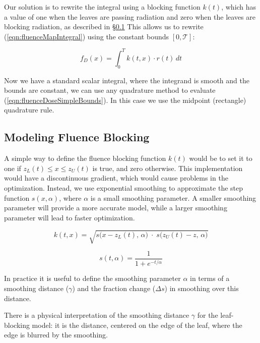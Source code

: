 Our solution is to rewrite the integral using a blocking function $k(t)$,
which has a value of one when the leaves are passing radiation and
zero when the leaves are blocking radiation, as described in \S\ref{sec:modelingFluenceBlocking}
This allows us to rewrite (\ref{eqn:fluenceMapIntegral}) using the constant bounds $[0, \mathcal{T}]$:

\begin{equation}
  f_D(x) = \int_0^T \! k(t, x) \cdot r(t) \, dt
  \label{eqn:fluenceDoseSimpleBounds}
\end{equation}

Now we have a standard scalar integral, where the integrand is smooth and the
bounds are constant, we can use any quadrature method to evaluate (\ref{eqn:fluenceDoseSimpleBounds}).
In this case we use the midpoint (rectangle) quadrature rule.

\subsection{Modeling Fluence Blocking}
\label{sec:modelingFluenceBlocking}

A simple way to define the fluence blocking function $k(t)$
would be to set it to one if $z_L(t) \leq x \leq z_U(t)$
is true, and zero otherwise.
This implementation would have a discontinuous gradient, which would cause problems in the optimization.
Instead, we use exponential smoothing to approximate the step function $s(x,\alpha)$,
where $\alpha$ is a small smoothing parameter.
A smaller smoothing parameter will provide a more accurate model,
while a larger smoothing parameter will lead to faster optimization.

\begin{equation}
  k(t, x) = \sqrt{s\big(x - z_L(t), \, \alpha\big) \; \cdot \; s\big(z_U(t) - z, \, \alpha\big)}
\end{equation}

\begin{equation}
  s(t, \alpha) = \frac{1}{1 + e^{-t/\alpha}}
\end{equation}

In practice it is useful to define the smoothing parameter $\alpha$ in terms of a smoothing distance ($\gamma$)
and the fraction change ($\Delta s$) in smoothing over this distance.

There is a physical interpretation of the smoothing distance $\gamma$ for the leaf-blocking model:
it is the distance, centered on the edge of the leaf, where the edge is blurred by the smoothing.


